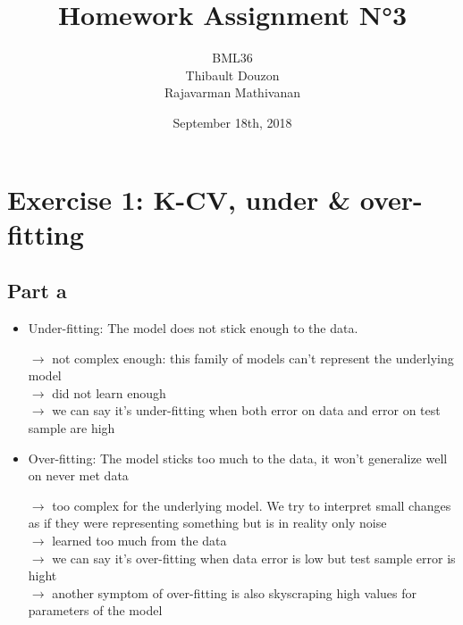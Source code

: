 \documentclass[a4paper, 10pt]{article}
\title{Homework Assignment N°3}
\author{BML36\\Thibault Douzon\\Rajavarman Mathivanan}
\date{September 18th, 2018}
\begin{document}
\maketitle

\pagebreak

\tableofcontents

\pagebreak

\section{Exercise 1: K-CV, under \& over-fitting}

\subsection{Part a}
\begin{itemize}[label=$\square$]
    \item Under-fitting: The model does not stick enough to the data.

    $\rightarrow$ not complex enough: this family of models can't represent the underlying model
    \\
    $\rightarrow$ did not learn enough
    \\
    $\rightarrow$ we can say it's under-fitting when both error on data and error on test sample are high

    \item Over-fitting: The model sticks too much to the data, it won't generalize well on never met data

    $\rightarrow$ too complex for the underlying model. We try to interpret small changes as if they were representing something but is in reality only noise
    \\
    $\rightarrow$ learned too much from the data
    \\
    $\rightarrow$ we can say it's over-fitting when data error is low but test sample error is hight
    \\
    $\rightarrow$ another symptom of over-fitting is also skyscraping high values for parameters of the model
    
\end{itemize}
\end{document}

